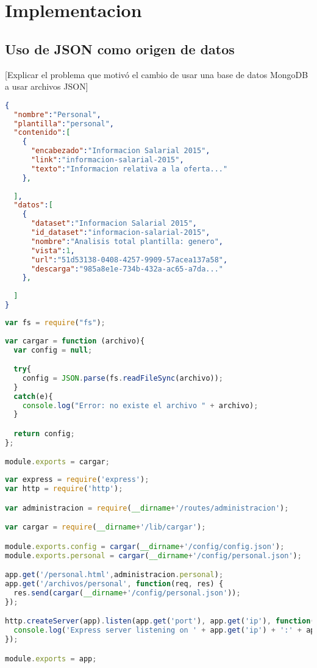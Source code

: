 \chapter{Implementacion}
 
\section{Uso de JSON como origen de datos}
 
[Explicar el problema que motivó el cambio de usar una base de datos MongoDB a usar archivos JSON]

\begin{lstlisting}[language=json,caption={Archivo JSON con informacion de personal},label={lst:json_personal}]
{
  "nombre":"Personal",
  "plantilla":"personal",
  "contenido":[
    {
      "encabezado":"Informacion Salarial 2015",
      "link":"informacion-salarial-2015",
      "texto":"Informacion relativa a la oferta..."
    },
    
  ],
  "datos":[
    {
      "dataset":"Informacion Salarial 2015",
      "id_dataset":"informacion-salarial-2015",
      "nombre":"Analisis total plantilla: genero",
      "vista":1,
      "url":"51d53138-0408-4257-9909-57acea137a58",
      "descarga":"985a8e1e-734b-432a-ac65-a7da..."
    },
        
  ]
}
\end{lstlisting}

\begin{lstlisting}[language=javascript,caption={Archivo {\tt cargar.js}},label={lst:cargarjs}]
var fs = require("fs");
 
var cargar = function (archivo){
  var config = null;

  try{
    config = JSON.parse(fs.readFileSync(archivo));
  }
  catch(e){
    console.log("Error: no existe el archivo " + archivo);
  }

  return config;
};

module.exports = cargar;
\end{lstlisting}

\begin{lstlisting}[language=javascript,caption={Archivo {\tt app.js}},label={lst:appjs}]
var express = require('express');
var http = require('http');

var administracion = require(__dirname+'/routes/administracion');

var cargar = require(__dirname+'/lib/cargar');

module.exports.config = cargar(__dirname+'/config/config.json');
module.exports.personal = cargar(__dirname+'/config/personal.json');

app.get('/personal.html',administracion.personal);
app.get('/archivos/personal', function(req, res) {
  res.send(cargar(__dirname+'/config/personal.json'));
});

http.createServer(app).listen(app.get('port'), app.get('ip'), function(){
  console.log('Express server listening on ' + app.get('ip') + ':' + app.get('port'));
});

module.exports = app;
\end{lstlisting}


